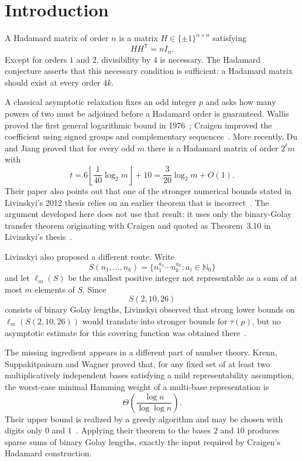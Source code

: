 \documentclass[11pt]{article}
\newcommand{\N}{\mathbb{N}}
\begin{document}
\section{Introduction}
A Hadamard matrix of order $n$ is a matrix $H\in\{\pm1\}^{n\times n}$ satisfying
\[
HH^{\mathsf T}=nI_n.
\]
Except for orders $1$ and $2$, divisibility by $4$ is necessary.  The Hadamard conjecture asserts that this necessary condition is sufficient: a Hadamard matrix should exist at every order $4k$.

A classical asymptotic relaxation fixes an odd integer $p$ and asks how many powers of two must be adjoined before a Hadamard order is guaranteed.  Wallis proved the first general logarithmic bound in 1976~\cite{Wallis1976}; Craigen improved the coefficient using signed groups and complementary sequences~\cite{Craigen1995}.  More recently, Du and Jiang proved that for every odd $m$ there is a Hadamard matrix of order $2^t m$ with
\begin{equation}\label{eq:dujiang}
 t=6\left\lfloor \frac{1}{40}\log_2 m\right\rfloor+10
   =\frac{3}{20}\log_2 m+O(1).
\end{equation}
Their paper also points out that one of the stronger numerical bounds stated in Livinskyi's 2012 thesis relies on an earlier theorem that is incorrect~\cite{DuJiang2024}.  The argument developed here does not use that result: it uses only the binary-Golay transfer theorem originating with Craigen and quoted as Theorem~3.10 in Livinskyi's thesis~\cite{Craigen1995,Livinskyi2012}.

Livinskyi also proposed a different route.  Write
\[
S(n_1,\ldots,n_k)=\{n_1^{a_1}\cdots n_k^{a_k}:a_i\in\N_0\}
\]
and let $\ell_m(S)$ be the smallest positive integer not representable as a sum of at most $m$ elements of $S$.  Since
\[
S(2,10,26)
\]
consists of binary Golay lengths, Livinskyi observed that strong lower bounds on $\ell_m(S(2,10,26))$ would translate into stronger bounds for $\tau(p)$, but no asymptotic estimate for this covering function was obtained there~\cite{Livinskyi2012}.

The missing ingredient appears in a different part of number theory.  Krenn, Suppakitpaisarn and Wagner proved that, for any fixed set of at least two multiplicatively independent bases satisfying a mild representability assumption, the worst-case minimal Hamming weight of a multi-base representation is
\[
\Theta\!\left(\frac{\log n}{\log\log n}\right).
\]
Their upper bound is realized by a greedy algorithm and may be chosen with digits only $0$ and $1$~\cite{Krenn2020}.  Applying their theorem to the bases $2$ and $10$ produces sparse sums of binary Golay lengths, exactly the input required by Craigen's Hadamard construction.
\end{document}
